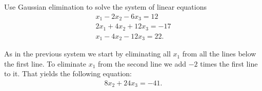 \documentclass[10pt]{article}
\begin{document}
\begin{exercise}[System 3]  \label{exe:System_3}
Use Gaussian elimination to solve the system of linear equations
\begin{align*}
x_1 - 2x_2 -6x_3 = 12 \\
2x_1 + 4x_2 + 12x_3 = -17 \\
x_1 - 4x_2 - 12x_3 = 22
.
\end{align*}
\end{exercise}
\begin{solution}[]  \label{sol:}
As in the previous system we start by eliminating all \(x_1\) from
all the lines below the first line.
To eliminate \(x_1\) from the second line we add \(-2\) times the first line
to it. That yields the following equation:
\begin{align*}
8x_2 + 24x_3 = -41
.
\end{align*}

\end{solution}
\end{document}
